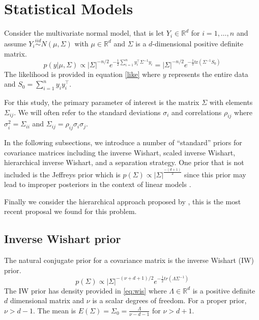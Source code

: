 \documentclass[a4paper]{article}
\begin{document}
\section{Statistical Models}

Consider the multivariate normal model, that is let $Y_i\in \mathbb{R}^d$ for $i=1,\ldots,n$ and assume $Y_i \stackrel{iid}{\sim} N(\mu, \Sigma)$ with $\mu\in \mathbb{R}^d$ and $\Sigma$ is a $d$-dimensional positive definite matrix.   
  \begin{equation}
 p(y\vert \mu,\Sigma) \propto |\Sigma|^{-n/2} e^{- \frac{1}{2} \sum_{i=1}^n y_i^\top \Sigma^{-1} y_i  } = |\Sigma|^{-n/2} e^{- \frac{1}{2}  \mbox{tr}(\Sigma^{-1}S_0)  } 
 \label{like}
 \end{equation} 
The likelihood is provided in equation \eqref{like} where $y$ represents the entire data and $S_0=\sum_{i=1}^n y_i y_i ^\top$.  

For this study, the primary parameter of interest is the matrix $\Sigma$ with elements $\Sigma_{ij}$. We will often refer to the standard deviations $\sigma_i$ and correlations $\rho_{ij}$ where $\sigma_i^2 = \Sigma_{ii}$ and $\Sigma_{ij} = \rho_{ij}\sigma_i\sigma_j$. 

In the following subsections, we introduce a number of ``standard'' priors for covariance matrices including the inverse Wishart, scaled inverse Wishart, hierarchical inverse Wishart, and a separation strategy. One prior that is not included is the Jeffreys prior which is $p(\Sigma)\propto |\Sigma| ^ {\frac{-(d+1)}{2} } $ since this prior may lead to improper posteriors in the context of linear models \citep{gelman2006prior, SIW2008}. 


 Finally we consider the hierarchical approach proposed by \cite{huang2013simple}, this is the most recent proposal we found for this problem. 

\subsection{Inverse Wishart prior}

The natural conjugate prior for a covariance matrix is the inverse Wishart (IW) prior\citep{barnard2000}. 
\begin{equation} 
p(\Sigma) \propto  |\Sigma|^{-(\nu+ d +1)/2 } e^{-\frac{1}{2} tr( \Lambda \Sigma^{-1}) }
\label{eq:wis}
\end{equation}
The IW prior has density provided in \eqref{eq:wis} where $\Lambda\in \mathbb{R}^d$ is a positive definite $d$ dimensional matrix and $\nu$ is a scalar degrees of freedom. For a proper prior, $\nu>d-1$. The mean is $E(\Sigma) = \Sigma_0= \frac{\Lambda}{\nu - d - 1}$ for $\nu>d+1$. 
\end{document}
